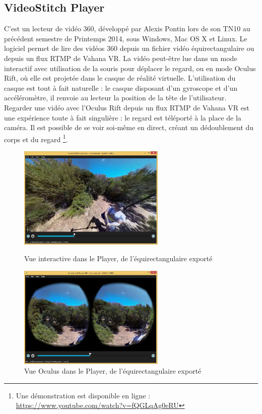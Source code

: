 \subsection{VideoStitch Player}
\label{videostitch-player-section}
C'est un lecteur de vidéo 360, développé par Alexis Pontin lors de son TN10 au précédent
semestre de Printemps 2014, sous Windows, Mac OS X et Linux. Le logiciel permet de lire des vidéos 360 depuis un 
fichier vidéo équirectangulaire ou depuis un flux RTMP de Vahana VR. La vidéo peut-être
lue dans un mode interactif avec utilisation de la souris pour déplacer le regard,
ou en mode Oculus Rift, où elle est projetée dans le casque de réalité virtuelle.
L'utilisation du casque est tout à fait naturelle : le casque disposant d'un gyroscope
et d'un accéléromètre, il renvoie au lecteur la position de la tête de l'utilisateur.\\
Regarder une vidéo avec l'Oculus Rift depuis un flux RTMP de Vahana VR est une 
expérience toute à fait singulière : le regard est téléporté à la place de la caméra.
Il est possible de se voir soi-même en direct, créant un dédoublement du corps et du regard
\footnote{Une démonstration est disponible en ligne : \url{https://www.youtube.com/watch?v=fQGLqAg0eRU}}.
\begin{figure}
  \centering
  \begin{minipage}{0.45\textwidth}
     \centering
     \includegraphics[width=7cm]{images/player-interactive.jpg}
     \caption{Vue interactive dans le Player, de l'équirectangulaire exporté}
  \end{minipage}%
  \hspace{0.08\textwidth}
  \begin{minipage}{0.45\textwidth}
    \centering
    \includegraphics[width=7cm]{images/player-oculus.jpg}
    \caption{Vue Oculus dans le Player, de l'équirectangulaire exporté}
  \end{minipage}
\end{figure}

